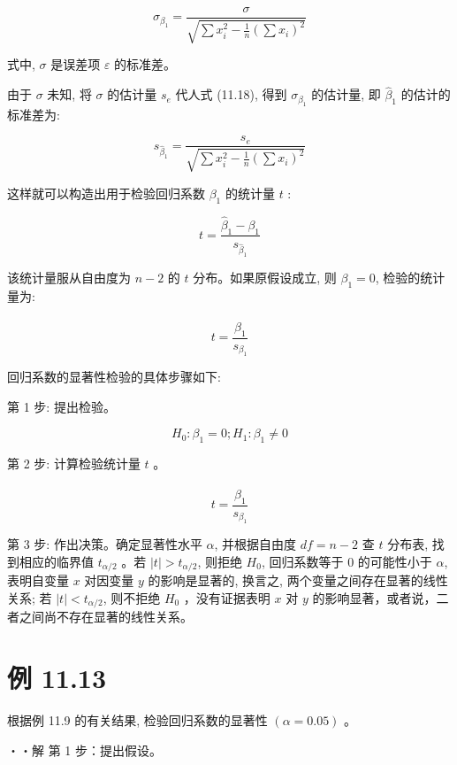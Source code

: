 \documentclass[10pt]{article}
\begin{document}
\begin{CJK*}{UTF8}{bsmi}
\begin{equation*}
\sigma_{\beta_{1}}=\frac{\sigma}{\sqrt{\sum x_{i}^{2}-\frac{1}{n}\left(\sum x_{i}\right)^{2}}} \tag{11.18}
\end{equation*}


式中, $\sigma$ 是误差项 $\varepsilon$ 的标准差。

由于 $\sigma$ 未知, 将 $\sigma$ 的估计量 $s_{e}$ 代人式 (11.18), 得到 $\sigma_{\beta_{1}}$ 的估计量, 即 $\hat{\beta}_{1}$ 的估计的标准差为:


\begin{equation*}
s_{\hat{\beta}_{1}}=\frac{s_{e}}{\sqrt{\sum x_{i}^{2}-\frac{1}{n}\left(\sum x_{i}\right)^{2}}} \tag{11.19}
\end{equation*}


这样就可以构造出用于检验回归系数 $\beta_{1}$ 的统计量 $t$ :


\begin{equation*}
t=\frac{\hat{\beta}_{1}-\beta_{1}}{s_{\hat{\beta}_{1}}} \tag{11.20}
\end{equation*}


该统计量服从自由度为 $n-2$ 的 $t$ 分布。如果原假设成立, 则 $\beta_{1}=0$, 检验的统计量为:


\begin{equation*}
t=\frac{\hat{\beta}_{1}}{s_{\beta_{1}}} \tag{11.21}
\end{equation*}


回归系数的显著性检验的具体步骤如下:

第 1 步: 提出检验。

$$
H_{0}: \beta_{1}=0 ; H_{1}: \beta_{1} \neq 0
$$

第 2 步: 计算检验统计量 $t$ 。

$$
t=\frac{\hat{\beta}_{1}}{s_{\beta_{1}}}
$$

第 3 步: 作出决策。确定显著性水平 $\alpha$, 并根据自由度 $d f=n-2$ 查 $t$ 分布表, 找到相应的临界值 $t_{\alpha / 2}$ 。若 $|t|>t_{\alpha / 2}$, 则拒绝 $H_{0}$, 回归系数等于 0 的可能性小于 $\alpha$, 表明自变量 $x$ 对因变量 $y$ 的影响是显著的, 换言之, 两个变量之间存在显著的线性关系; 若 $|t|<t_{\alpha / 2}$, 则不拒绝 $H_{0}$ ，没有证据表明 $x$ 对 $y$ 的影响显著，或者说，二者之间尚不存在显著的线性关系。

\section*{例 11.13}
根据例 11.9 的有关结果, 检验回归系数的显著性 $(\alpha=0.05)$ 。

・・解 第 1 步：提出假设。


\end{CJK*}
\end{document}
